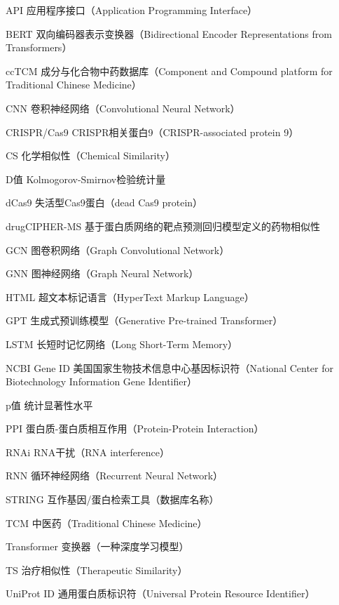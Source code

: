 
\begin{denotation}[3cm]
  \item[API]{应用程序接口（Application Programming Interface）}
  \item[BERT]{双向编码器表示变换器（Bidirectional Encoder Representations from Transformers）}
  \item[ccTCM]{成分与化合物中药数据库（Component and Compound platform for Traditional Chinese Medicine）}
  \item[CNN]{卷积神经网络（Convolutional Neural Network）}
  \item[CRISPR/Cas9]{CRISPR相关蛋白9（CRISPR-associated protein 9）}
  \item[CS]{化学相似性（Chemical Similarity）}
  \item[D值]{Kolmogorov-Smirnov检验统计量}
  \item[dCas9]{失活型Cas9蛋白（dead Cas9 protein）}
  \item[drugCIPHER-MS]{基于蛋白质网络的靶点预测回归模型定义的药物相似性}
  \item[GCN]{图卷积网络（Graph Convolutional Network）}
  \item[GNN]{图神经网络（Graph Neural Network）}
  \item[HTML]{超文本标记语言（HyperText Markup Language）}
  \item[GPT]{生成式预训练模型（Generative Pre-trained Transformer）}
  \item[LSTM]{长短时记忆网络（Long Short-Term Memory）}
  \item[NCBI Gene ID]{美国国家生物技术信息中心基因标识符（National Center for Biotechnology Information Gene Identifier）}
  \item[p值]{统计显著性水平}
  \item[PPI]{蛋白质-蛋白质相互作用（Protein-Protein Interaction）}
  \item[RNAi]{RNA干扰（RNA interference）}
  \item[RNN]{循环神经网络（Recurrent Neural Network）}
  \item[STRING]{互作基因/蛋白检索工具（数据库名称）}
  \item[TCM]{中医药（Traditional Chinese Medicine）}
  \item[Transformer]{变换器（一种深度学习模型）}
  \item[TS]{治疗相似性（Therapeutic Similarity）}
  \item[UniProt ID]{通用蛋白质标识符（Universal Protein Resource Identifier）}
\end{denotation}



